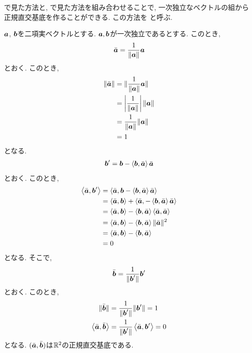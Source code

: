 \begin{remark}
  \label{thm:gramschmidt}
  で見た方法と,
  で見た方法を組み合わせることで,
  一次独立なベクトルの組から正規直交基底を作ることができる.
  この方法を
  と呼ぶ.
  
  $\aaa$, $\bbb$を二項実ベクトルとする.
  $\aaa,\bbb$が一次独立であるとする.
  このとき,
  \begin{align*}
    \bar\aaa=\frac{1}{\|\aaa\|}\aaa
  \end{align*}
  とおく. このとき,
  \begin{align*}
    \|\bar\aaa\|
    &=\|\frac{1}{\|\aaa\|}\aaa\|\\
    &=\left|\frac{1}{\|\aaa\|}\right|\|\aaa\|\\
    &=\frac{1}{\|\aaa\|}\|\aaa\|\\
    &=1
  \end{align*}
  となる.
  \begin{align*}
    \bbb'=\bbb-\Braket{\bbb,\bar\aaa}\bar\aaa
  \end{align*}
  とおく. このとき,
  \begin{align*}
    \Braket{\bar\aaa,\bbb'}
    &=\Braket{\bar\aaa,\bbb-\Braket{\bbb,\bar\aaa}\bar\aaa}\\
    &=\Braket{\bar\aaa,\bbb}+\Braket{\bar\aaa,-\Braket{\bbb,\bar\aaa}\bar\aaa}\\
    &=\Braket{\bar\aaa,\bbb}-\Braket{\bbb,\bar\aaa}\Braket{\bar\aaa,\bar\aaa}\\
    &=\Braket{\bar\aaa,\bbb}-\Braket{\bbb,\bar\aaa}\|\bar\aaa\|^2\\
    &=\Braket{\bar\aaa,\bbb}-\Braket{\bbb,\bar\aaa}\\
    &=0
  \end{align*}
  となる.  そこで,
  \begin{align*}
    \bar\bbb=\frac{1}{\|\bbb'\|}\bbb'
  \end{align*}
  とおく.  このとき,
  \begin{align*}
    \|\bar\bbb\|&=\frac{1}{\|\bbb'\|}\|\bbb'\|=1\\
    \Braket{\bar\aaa,\bar\bbb}&=\frac{1}{\|\bbb'\|}\Braket{\bar\aaa,\bbb'}=0
  \end{align*}
  となる.
  $(\bar\aaa,\bar\bbb)$は$\RR^2$の正規直交基底である.
\end{remark}

